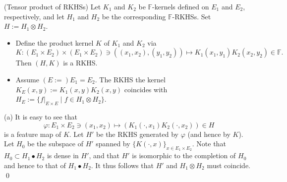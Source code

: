 \documentclass[a4paper,12pt]{article}
\begin{document}
\begin{thm} (Tensor product of RKHSs)
	Let \( K_1 \) and \( K_2 \) be \( \mathbb{F} \)-kernels defined on \( E_1 \) and \( E_2 \), respectively, and let \( H_1 \) and \( H_2 \) be the corresponding \( \mathbb{F} \)-RKHSs. Set \( H:=H_1 \otimes H_2 \).
	\begin{itemize}
		\item[(a)] Define the product kernel \( K \) of \( K_1 \) and \( K_2 \) via
		      \begin{equation*}
			      K:(E_1 \times E_2) \times (E_1 \times E_2) \ni \left( (x_1, x_2), (y_1,y_2) \right) \mapsto K_1(x_1,y_1)K_2(x_2,y_2) \in \mathbb{F}.
		      \end{equation*}
		      Then \( (H,K) \) is a RKHS.
		\item[(b)] Assume \( (E:=) E_1 = E_2 \). The RKHS the kernel \( K_E(x,y) :=K_1(x,y)K_2(x,y) \) coincides with \( H_E:=\{f|_{E \times E} \mid f \in H_1 \otimes H_2\} \).
	\end{itemize}
\end{thm}
\begin{prf}
	(a) It is easy to see that
	\begin{equation*}
		\varphi:E_1 \times E_2 \ni (x_1,x_2) \mapsto \left( K_1(\cdot ,x_1)K_2(\cdot ,x_2) \right)\in H
	\end{equation*}
	is a feature map of \( K \). Let \( H' \) be the RKHS generated by \( \varphi \) (and hence by \( K \)). Let \( H_0 \) be the subspace of \( H' \) spanned by \( \{K(\cdot ,x)\}_{x \in E_1 \times E_2} \).
	Note that \( H_0 \subset H_1 \bullet H_2\) is dense in \( H' \), and that \( H' \) is isomorphic to the completion of \( H_0 \) and hence to that of \( H_1 \bullet H_2 \). It thus follows that \( H' \) and \( H_1 \otimes H_2 \) must coincide.
	\qed\end{prf}
\end{document}
